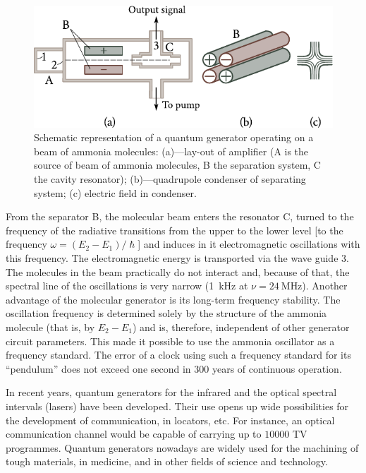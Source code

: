 \begin{figure}[t]
	\begin{center}
		\includegraphics[scale=1]{figures/ch_07/fig_7_30.pdf}
		\caption[]{Schematic representation of a quantum generator operating on a beam of ammonia molecules: (a)---lay-out of amplifier (A is the source of beam of ammonia molecules, B the separation system, C the cavity resonator); (b)---quadrupole condenser of separating system; (c) electric field in condenser.}
		\label{fig:7_30}
	\end{center}
	\vspace{-0.8cm}
\end{figure}

From the separator B, the molecular beam enters the resonator C, turned to the frequency of the radiative transitions from the upper to the lower level [to the frequency $\omega=(E_2-E_1)/\hslash$] and induces in it electromagnetic oscillations with this frequency. The electromagnetic energy is transported via the wave guide $3$. The molecules in the beam practically do not interact and, because of that, the spectral line of the oscillations is very narrow (\SI{1}{\kilo\hertz} at $\nu=\SI{24}{\mega\hertz}$). Another advantage of the molecular generator is its long-term frequency
stability. The oscillation frequency is determined solely by the structure of the ammonia molecule (that is, by $E_2-E_1$) and is, therefore, independent of other generator circuit parameters. This made it possible to use the ammonia oscillator as a frequency standard. The error of a clock using such a frequency standard for its ``pendulum'' does not exceed one second in $300$ years of continuous
operation.

In recent years, quantum generators for the infrared and the optical spectral intervals (lasers) have been developed. Their use opens up wide possibilities for the development of communication, in locators, etc. For instance, an optical communication channel would be capable of carrying up to $10000$ TV programmes. Quantum generators nowadays are widely used for the machining of tough materials, in medicine, and in other fields of science and technology.

